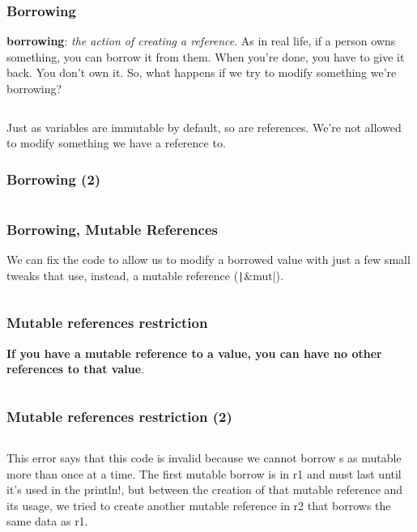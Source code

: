 \documentclass{beamer}
\begin{document}
\begin{frame}[fragile]
	\frametitle{Borrowing}
	\textbf{borrowing}: \textit{the action of creating a reference}.
	As in real life, if a person owns something, you can borrow it from them. When you’re done, you have to give it back. You don’t own it. So, what happens if we try to modify something we’re borrowing?
		\inputminted{rust}{./code/borrowing.rs}
		
		\small
	Just as variables are immutable by default, so are references. We’re not allowed to modify something we have a reference to.
\end{frame}

\begin{frame}[fragile]
	\frametitle{Borrowing (2)}
	\inputminted{shell}{./code/borrowing.shell}
\end{frame}


\begin{frame}[fragile]
	\frametitle{Borrowing, Mutable References}
	We can fix the code to allow us to modify a borrowed value with just a few small tweaks that use, instead, a mutable reference (\texttt|&mut|).
	\inputminted{rust}{./code/borrowing-mut-ref.rs}
\end{frame}


\begin{frame}[fragile]
	\frametitle{Mutable references restriction}
	\textbf{If you have a mutable reference to a value, you can have no other references to that value}. 
	\inputminted{rust}{./code/borrowing-mut-ref-err1.rs}
\end{frame}

\begin{frame}[fragile]
	\frametitle{Mutable references restriction (2)}
	\inputminted[fontsize=\scriptsize]{shell}{./code/borrowing-mut-ref-err1.shell}
	
	\scriptsize
	This error says that this code is invalid because we cannot borrow s as mutable more than once at a time. The first mutable borrow is in r1 and must last until it’s used in the println!, but between the creation of that mutable reference and its usage, we tried to create another mutable reference in r2 that borrows the same data as r1.
	
\end{frame}
\end{document}
